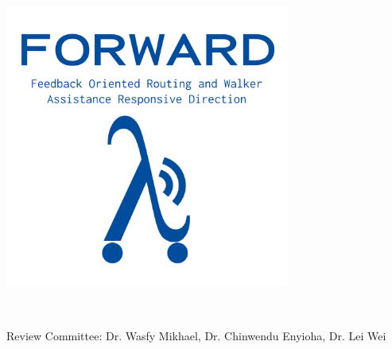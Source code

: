 
\begin{titlepage}
	
	\maketitle
	\thispagestyle{empty}
	\begin{center}
		\includegraphics[width=0.7\textwidth]{./Images/FORWARD_logo_type_blue.png}
	\end{center}

	\hfill \break \\[\baselineskip]

	\begin{center}
		Review Committee: Dr. Wasfy Mikhael, Dr. Chinwendu Enyioha, Dr. Lei Wei
	\end{center}
	
	\centering
	\hfill \break \\[2\baselineskip]
	
	\fancyhf
	
\end{titlepage}